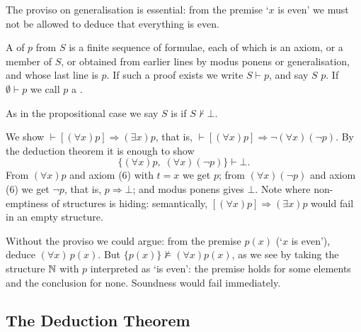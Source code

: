\documentclass[a4paper]{scrartcl}
\begin{document}
The proviso on generalisation is essential: from the premise `$x$ is even' we must not be allowed to deduce that everything is even.

\begin{definition}
  A  of $p$ from $S$ is a finite sequence of formulae, each of which is an axiom, or a member of $S$, or obtained from earlier lines by modus ponens or generalisation, and whose last line is $p$. If such a proof exists we write $S \vdash p$, and say $S$  $p$. If $\emptyset \vdash p$ we call $p$ a .
\end{definition}

As in the propositional case we say $S$ is  if $S \not\vdash \bot$.

\begin{example}
  We show $\vdash [(\forall x)p] \Rightarrow (\exists x)p$, that is, $\vdash [(\forall x)p] \Rightarrow \lnot(\forall x)(\lnot p)$. By the deduction theorem it is enough to show
  $$\{(\forall x)p, \; (\forall x)(\lnot p)\} \vdash \bot.$$
  From $(\forall x) p$ and axiom (6) with $t = x$ we get $p$; from $(\forall x)(\lnot p)$ and axiom (6) we get $\lnot p$, that is, $p \Rightarrow \bot$; and modus ponens gives $\bot$. Note where non-emptiness of structures is hiding: semantically, $[(\forall x)p] \Rightarrow (\exists x)p$ would fail in an empty structure.
\end{example}

\begin{example}
  Without the proviso we could argue: from the premise $p(x)$ (`$x$ is even'), deduce $(\forall x)\,p(x)$. But $\{p(x)\} \not\models (\forall x)p(x)$, as we see by taking the structure $\mathbb{N}$ with $p$ interpreted as `is even': the premise holds for some elements and the conclusion for none. Soundness would fail immediately.
\end{example}

\subsection{The Deduction Theorem}
\end{document}
